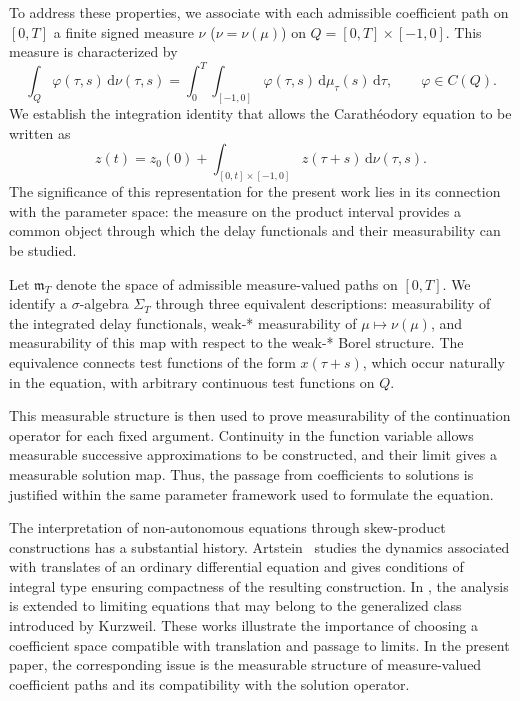 \documentclass[reqno]{amsart}
\theoremstyle{plain}
\numberwithin{equation}{section}
\numberwithin{definition}{section}
\newcommand{\dd}{\ensuremath{\mathrm{d}}}
\begin{document}
To address these properties, we associate with each
admissible coefficient path on $[0,T]$ a finite signed
measure $\nu$ ($\nu=\nu(\mu)$) on $Q=[0,T]\times[-1,0]$.
This measure is characterized by
\begin{equation*}
    \int_{Q}\varphi(\tau,s)\,\dd\nu(\tau,s)
    =
    \int_0^T
    \int_{[-1,0]}
    \varphi(\tau,s)\,\dd\mu_\tau(s)\,\dd\tau,
    \qquad \varphi\in C(Q).
\end{equation*}
We establish the integration identity that allows the
Carath\'eodory equation to be written as
\begin{equation*}
    z(t)
    =
    z_0(0)
    +
    \int_{[0,t]\times[-1,0]}
    z(\tau+s)\,\dd\nu(\tau,s).
\end{equation*}
The significance of this representation for the present
work lies in its connection with the parameter space:
the measure on the product interval provides a common
object through which the delay functionals and their
measurability can be studied.

Let $\mathfrak m_T$ denote the space of admissible
measure-valued paths on $[0,T]$.
We identify a $\sigma$-algebra $\Sigma_T$ through
three equivalent descriptions: measurability of the
integrated delay functionals, weak-* measurability
of $\mu\mapsto\nu(\mu)$, and measurability of this map
with respect to the weak-* Borel structure.
The equivalence connects test functions of the form
$x(\tau+s)$, which occur naturally in the equation,
with arbitrary continuous test functions on $Q$.

This measurable structure is then used to prove
measurability of the continuation operator for each
fixed argument. Continuity in the function variable
allows measurable successive approximations to be
constructed, and their limit gives a measurable solution
map. Thus, the passage from coefficients to solutions
is justified within the same parameter framework
used to formulate the equation.

The interpretation of non-autonomous equations through
skew-product constructions has a substantial history.
Artstein~\cite{Artstein1977ODE} studies the dynamics
associated with translates of an ordinary differential
equation and gives conditions of integral type ensuring
compactness of the resulting construction.
In \cite{Artstein1977Kurzweil}, the analysis is extended
to limiting equations that may belong to the generalized
class introduced by Kurzweil.
These works illustrate the importance of choosing
a coefficient space compatible with translation
and passage to limits.
In the present paper, the corresponding issue is
the measurable structure of measure-valued coefficient
paths and its compatibility with the solution operator.
\end{document}
